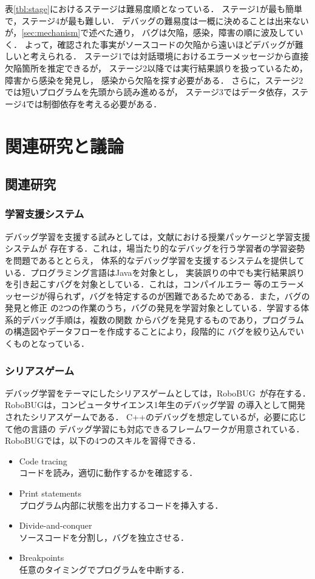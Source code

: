 \documentclass{jreport}
\begin{document}
表\ref{tbl:stage}におけるステージは難易度順となっている．
ステージ1が最も簡単で，ステージ4が最も難しい．
デバッグの難易度は一概に決めることは出来ないが，\ref{sec:mechanism}で述べた通り，
バグは欠陥，感染，障害の順に波及していく．
よって，確認された事実がソースコードの欠陥から遠いほどデバッグが難しいと考えられる．
ステージ1では対話環境におけるエラーメッセージから直接欠陥箇所を推定できるが，
ステージ2以降では実行結果誤りを扱っているため，障害から感染を発見し，
感染から欠陥を探す必要がある．
さらに，ステージ2では短いプログラムを先頭から読み進めるが，
ステージ3ではデータ依存，ステージ4では制御依存を考える必要がある．

\chapter{関連研究と議論}
\section{関連研究}
\subsection{学習支援システム}
デバッグ学習を支援する試みとしては，文献\cite{Yama}における授業パッケージと学習支援システムが
存在する．これは，場当たり的なデバッグを行う学習者の学習姿勢を問題であるととらえ，
体系的なデバッグ学習を支援するシステムを提供している．プログラミング言語はJavaを対象とし，
実装誤りの中でも実行結果誤りを引き起こすバグを対象としている．これは，コンパイルエラー
等のエラーメッセージが得られず，バグを特定するのが困難であるためである．また，バグの発見と修正
の2つの作業のうち，バグの発見を学習対象としている．学習する体系的デバッグ手順は，複数の関数
からバグを発見するものであり，プログラムの構造図やデータフローを作成することにより，段階的に
バグを絞り込んでいくものとなっている．

\subsection{シリアスゲーム}
デバッグ学習をテーマにしたシリアスゲームとしては，RoboBUG~\cite{robobug}が存在する．
RoboBUGは，コンピュータサイエンス1年生のデバッグ学習
の導入として開発されたシリアスゲームである．
C++のデバッグを想定しているが，必要に応じて他の言語の
デバッグ学習にも対応できるフレームワークが用意されている．
RoboBUGでは，以下の4つのスキルを習得できる．
\begin{itemize}
  \item Code tracing\\
  コードを読み，適切に動作するかを確認する．
  \item Print statements\\
  プログラム内部に状態を出力するコードを挿入する．
  \item Divide-and-conquer\\
  ソースコードを分割し，バグを独立させる．
  \item Breakpoints\\
  任意のタイミングでプログラムを中断する．
\end{itemize}
\end{document}
